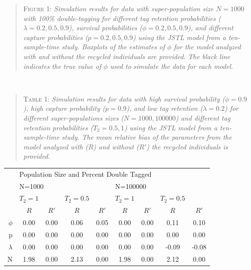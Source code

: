 \documentclass[]{article}
\begin{document}
\begin{quote}
\textsc{Figure 1:}
\textsl{Simulation results for data with super-population size $N=1000$ with 100\% double-tagging for different tag retention probabilities ($\lambda=0.2,0.5,0.9$), survival probabilities ($\phi=0.2,0.5,0.9$), and different capture probabilities ($p=0.2,0.5,0.9$) using the JSTL model from a ten-sample-time study. Boxplots of the estimates of $\phi$ for the model analyzed with and without the recycled individuals are provided. The black line indicates the true value of $\phi$ used to simulate the data for each model.}
\end{quote}

~ ~

\begin{quote}
\textsc{Table 1:}
\textsl{Simulation results for data with high survival probability ($\phi=0.9$), high capture probability ($p=0.9$), and low tag retention ($\lambda=0.2$)  for different super-populations sizes ($N=1000,100000$) and different tag retention probabilities ($T_2=0.5,1$) using the JSTL model from a ten-sample-time study. The mean relative bias of the parameters from the model analyzed with ($R$) and without ($R'$) the recycled individuals is provided.}
\end{quote}

\begin{table}[ht]
\centering
\begin{tabular}{rcccccccc}
  \hline
  & \multicolumn{8}{l}{Population Size and Percent Double Tagged} \\
  \cline{2-9}
  & \multicolumn{4}{l}{N=1000} & \multicolumn{4}{l}{N=100000} \\
  \cline {2-9}
  & $T_2=1$ && $T_2=0.5$ && $T_2=1$ && $T_2=0.5$ &  \\ 
  \cline {2-9}
  & $R$ & $R'$ & $R$ & $R'$ & $R$ & $R'$ & $R$ & $R'$ \\ 
  \hline
$\phi$ & 0.00 & 0.00 & 0.06 & 0.05 & 0.00 & 0.00 & 0.11 & 0.10 \\ 
  p & 0.00 & 0.00 & 0.00 & 0.00 & 0.00 & 0.00 & 0.00 & 0.00 \\ 
  $\lambda$ & 0.00 & 0.00 & 0.00 & 0.00 & 0.00 & 0.00 & -0.09 & -0.08 \\ 
  N & 1.98 & 0.00 & 2.13 & 0.00 & 1.98 & 0.00 & 2.12 & 0.00 \\ 
   \hline
\end{tabular}
\end{table}

~ ~
\end{document}
